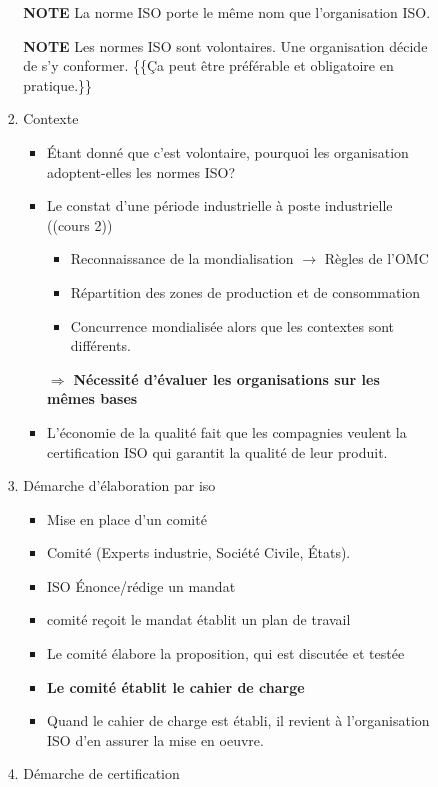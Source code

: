 \documentclass[11pt]{article}
\begin{document}
\begin{enumerate}
\begin{enumerate}
\begin{enumerate}
\begin{enumerate}
\textbf{NOTE} La norme ISO porte le même nom que l'organisation ISO.

\textbf{NOTE} Les normes ISO sont volontaires.  Une organisation décide de s'y
conformer.  \{\{Ça peut être préférable et obligatoire en pratique.\}\}

\item Contexte
\label{sec:org507574f}

\begin{itemize}
\item Étant donné que c'est volontaire, pourquoi les organisation adoptent-elles les
normes ISO?

\item Le constat d'une période industrielle à poste industrielle ((cours 2))
\begin{itemize}
\item Reconnaissance de la mondialisation \(\rightarrow\) Règles de l'OMC
\item Répartition des zones de production et de consommation
\item Concurrence mondialisée alors que les contextes sont différents.
\end{itemize}

\(\Rightarrow\) \textbf{Nécessité d'évaluer les organisations sur les mêmes bases}

\item L'économie de la qualité fait que les compagnies veulent la certification ISO
qui garantit la qualité de leur produit.
\end{itemize}
\item Démarche d'élaboration par iso
\label{sec:org8ff800d}

\begin{itemize}
\item Mise en place d'un comité
\item Comité (Experts industrie, Société Civile, États).
\item ISO Énonce/rédige un mandat
\item comité reçoit le mandat établit un plan de travail
\item Le comité élabore la proposition, qui est discutée et testée
\item \textbf{Le comité établit le cahier de charge}
\item Quand le cahier de charge est établi, il revient à l'organisation ISO d'en
assurer la mise en oeuvre.
\end{itemize}

\item Démarche de certification
\label{sec:orgbec1151}


\end{enumerate}
\end{enumerate}
\end{enumerate}
\end{enumerate}
\end{document}
